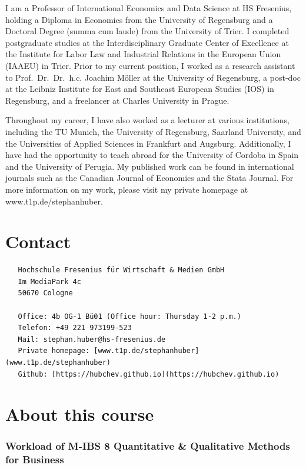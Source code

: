 \documentclass[
  12pt,
  oneside]{book}
\theoremstyle{definition}
\theoremstyle{definition}
\theoremstyle{definition}
\theoremstyle{definition}
\theoremstyle{remark}
\begin{document}
I am a Professor of International Economics and Data Science at HS Fresenius, holding a Diploma in Economics from the University of Regensburg and a Doctoral Degree (summa cum laude) from the University of Trier. I completed postgraduate studies at the Interdisciplinary Graduate Center of Excellence at the Institute for Labor Law and Industrial Relations in the European Union (IAAEU) in Trier. Prior to my current position, I worked as a research assistant to Prof.~Dr.~Dr.~h.c. Joachim Möller at the University of Regensburg, a post-doc at the Leibniz Institute for East and Southeast European Studies (IOS) in Regensburg, and a freelancer at Charles University in Prague.

Throughout my career, I have also worked as a lecturer at various institutions, including the TU Munich, the University of Regensburg, Saarland University, and the Universities of Applied Sciences in Frankfurt and Augsburg. Additionally, I have had the opportunity to teach abroad for the University of Cordoba in Spain and the University of Perugia. My published work can be found in international journals such as the Canadian Journal of Economics and the Stata Journal. For more information on my work, please visit my private homepage at www.t1p.de/stephanhuber.

\hypertarget{contact}{%
\section*{Contact}\label{contact}}

\begin{verbatim}
   Hochschule Fresenius für Wirtschaft & Medien GmbH
   Im MediaPark 4c
   50670 Cologne
   
   Office: 4b OG-1 Bü01 (Office hour: Thursday 1-2 p.m.)
   Telefon: +49 221 973199-523
   Mail: stephan.huber@hs-fresenius.de
   Private homepage: [www.t1p.de/stephanhuber](www.t1p.de/stephanhuber)
   Github: [https://hubchev.github.io](https://hubchev.github.io)
\end{verbatim}

\hypertarget{about-this-course}{%
\section*{About this course}\label{about-this-course}}

\hypertarget{workload-of-m-ibs-8-quantitative-qualitative-methods-for-business}{%
\subsubsection*{Workload of M-IBS 8 Quantitative \& Qualitative Methods for Business}\label{workload-of-m-ibs-8-quantitative-qualitative-methods-for-business}}
\end{document}

